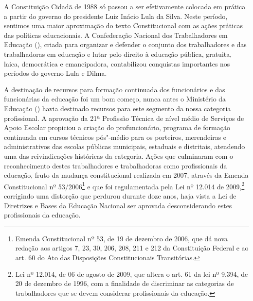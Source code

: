 A Constituição Cidadã de 1988 só passou a ser efetivamente colocada em
prática a partir do governo do presidente Luiz Inácio Lula da Silva.
Neste período, sentimos uma maior aproximação do texto Constitucional
com as ações práticas das políticas educacionais. A Confederação
Nacional dos Trabalhadores em Educação (), criada para organizar e
defender o conjunto dos trabalhadores e das trabalhadoras em educação e
lutar pelo direito à educação pública, gratuita, laica, democrática e
emancipadora, contabilizou conquistas importantes nos períodos do
governo Lula e Dilma.

A destinação de recursos para formação continuada dos funcionários e das
funcionárias da educação foi um bom começo, nunca antes o Ministério da
Educação () havia destinado recursos para este segmento da nossa
categoria profissional. A aprovação da 21ª Profissão Técnica de nível
médio de Serviços de Apoio Escolar propiciou a criação do
profuncionário, programa
de formação continuada em cursos técnicos pós"-médio para os porteiros,
merendeiras e administrativos das escolas públicas municipais, estaduais
e distritais, atendendo uma das reivindicações históricas da categoria.
Ações que culminaram com o reconhecimento destes
trabalhadores e trabalhadoras como profissionais da
educação, fruto da mudança constitucional realizada em 2007, através da
Emenda Constitucional nº 53/2006\footnote{Emenda Constitucional
  nº 53, de 19 de dezembro de 2006, que dá nova redação aos artigos 7, 23,
  30, 206, 208, 211 e 212 da Constituição Federal e ao art. 60 do Ato
  das Disposições Constitucionais Transitórias.} e que foi regulamentada
pela Lei nº 12.014 de 2009,\footnote{Lei nº 12.014, de 06 de
  agosto de 2009, que altera o art. 61 da lei nº 9.394, de 20 de dezembro
  de 1996, com a finalidade de discriminar as categorias de
  trabalhadores que se devem considerar profissionais da educação.}
corrigindo uma distorção que perdurou durante doze anos, haja vista a
Lei de Diretrizes e Bases da Educação Nacional ser aprovada
desconsiderando estes profissionais da educação.

